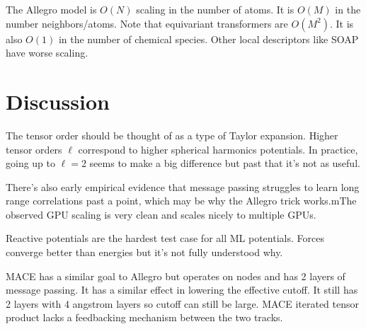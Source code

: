 \documentclass[book.tex]{subfiles}
\begin{document}
The Allegro model is $O(N)$ scaling in the number of atoms. It is $O(M)$ in the number neighbors/atoms. Note that equivariant transformers are $O(M^2)$. It is also $O(1)$ in the number of chemical species. Other local descriptors like SOAP have worse scaling.

\section{Discussion}

The tensor order should be thought of as a type of Taylor expansion. Higher tensor orders $\ell$ correspond to higher spherical harmonics potentials. In practice, going up to $\ell=2$ seems to make a big difference but past that it's not as useful.

There's also early empirical evidence that message passing struggles to learn long range correlations past a point, which may be why the Allegro trick works.mThe observed GPU scaling is very clean and scales nicely to multiple GPUs. %

Reactive potentials are the hardest test case for all ML potentials. Forces converge better than energies but it's not fully understood why.

MACE has a similar goal to Allegro but operates on nodes and has 2 layers of message passing. It has a similar effect in lowering the effective cutoff. It still has 2 layers with 4 angstrom layers so cutoff can still be large. MACE iterated tensor product lacks a feedbacking mechanism between the two tracks.



\end{document}
